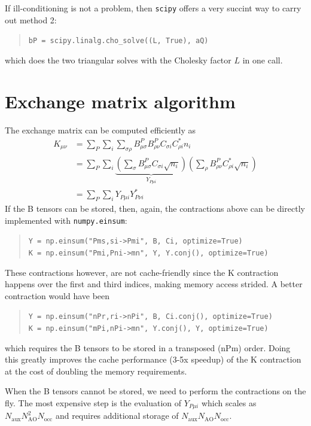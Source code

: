 \documentclass[aip,preprint]{revtex4-1}
\begin{document}
If ill-conditioning is not a problem, then \texttt{scipy} offers a very succint way to carry out method 2:
\begin{quote}
    \texttt{bP = scipy.linalg.cho\_solve((L, True), aQ)}
\end{quote}
which does the two triangular solves with the Cholesky factor $L$ in one call.

\section{Exchange matrix algorithm}

The exchange matrix can be computed efficiently as
\begin{equation}
\label{eq:exchange}
\begin{split}
K_{\mu \nu} &= \sum_{P} \sum_{i}
\sum_{\sigma \rho} B^{P}_{\mu \sigma} B^{P}_{\rho \nu} C_{\sigma i} C^*_{\rho i} n_i \\
&= \sum_{P} \sum_{i}
\underbrace{\left(\sum_{\sigma} B^{P}_{\mu \sigma}  C_{\sigma i}\sqrt{n_i} \right)}_{Y_{P \mu i}}
\left(\sum_{\rho} B^{P}_{\rho \nu} C^*_{\rho i} \sqrt{n_i}\right) \\
&= \sum_{P} \sum_{i}
Y_{P \mu i} Y^*_{P \nu i}
\end{split}
\end{equation}
If the B tensors can be stored, then, again, the contractions above can be directly implemented with \texttt{numpy.einsum}:
\begin{quote}
    \texttt{Y = np.einsum("Pms,si->Pmi", B, Ci, optimize=True)}\\
    \texttt{K = np.einsum("Pmi,Pni->mn", Y, Y.conj(), optimize=True)}
\end{quote}
These contractions however, are not cache-friendly since the K contraction happens over the first and third indices, making memory access strided.
A better contraction would have been
\begin{quote}
    \texttt{Y = np.einsum("nPr,ri->nPi", B, Ci.conj(), optimize=True)}\\
    \texttt{K = np.einsum("mPi,nPi->mn", Y.conj(), Y, optimize=True)}
\end{quote}
which requires the B tensors to be stored in a transposed (nPm) order.
Doing this greatly improves the cache performance (3-5x speedup) of the K contraction at the cost of doubling the memory requirements.

When the B tensors cannot be stored, we need to perform the contractions on the fly. 
The most expensive step is the evaluation of $Y_{P \mu i}$ which scales as $N_\mathrm{aux} N_{\mathrm{AO}}^2 N_{\mathrm{occ}}$ and requires additional storage of $N_\mathrm{aux} N_{\mathrm{AO}} N_{\mathrm{occ}}$.
\end{document}
